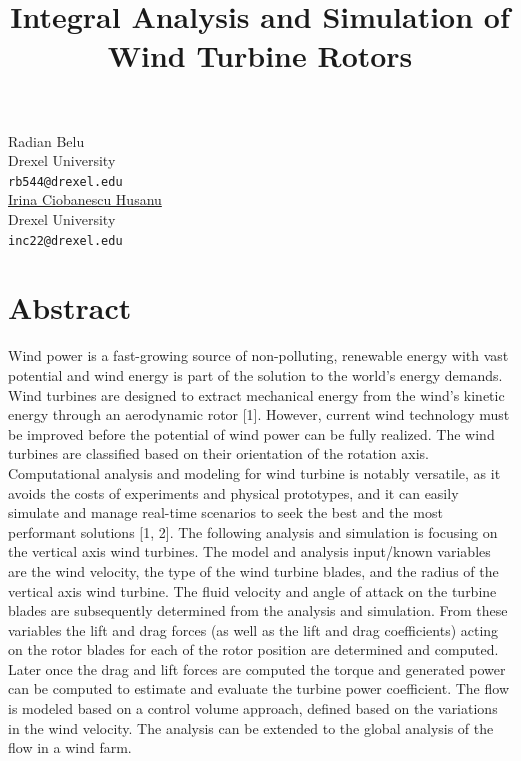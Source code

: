 \documentclass[article, A4, 11pt]{llncs}%
\begin{document}
\title{Integral Analysis and Simulation of Wind Turbine Rotors}
 \author{} \institute{}
\maketitle
\begin{center}
{\large Radian Belu}\\
Drexel University\\
{\tt rb544@drexel.edu}
\\ \vspace{4mm}
{\large \underline{Irina Ciobanescu Husanu}}\\
Drexel University\\
{\tt inc22@drexel.edu}
\end{center}

\section*{Abstract}
Wind power is a fast-growing source of non-polluting, renewable energy with vast potential and wind energy is part of the solution to the world's energy demands. Wind turbines are designed to extract mechanical energy from the wind's kinetic energy through an aerodynamic rotor [1]. However, current wind technology must be improved before the potential of wind power can be fully realized. The wind turbines are classified based on their orientation of the rotation axis. Computational analysis and modeling for wind turbine is notably versatile, as it avoids the costs of experiments and physical prototypes, and it can easily simulate and manage real-time scenarios to seek the best and the most performant solutions [1, 2]. The following analysis and simulation is focusing on the vertical axis wind turbines. The model and analysis input/known variables are the wind velocity, the type of the wind turbine blades, and the radius of the vertical axis wind turbine. The fluid velocity and angle of attack on the turbine blades are subsequently determined from the analysis and simulation. From these variables the lift and drag forces (as well as the lift and drag coefficients) acting on the rotor blades for each of the rotor position are determined and computed. Later once the drag and lift forces are computed the torque and generated power can be computed to estimate and evaluate the turbine power coefficient. The flow is modeled based on a control volume approach, defined based on the variations in the wind velocity. The analysis can be extended to the global analysis of the flow in a wind farm.
\end{document}
